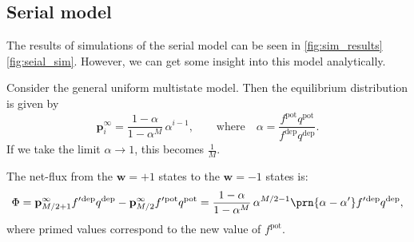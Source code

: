 \documentclass[10pt]{article}
\newcommand{\pr}{\mathbf{p}}
\newcommand{\eq}{\pr^\infty}
\newcommand{\w}{\mathbf{w}}
\newcommand{\pot}{^{\text{pot}}}
\newcommand{\dep}{^{\text{dep}}}
\begin{document}
%
%
%




\subsection{Serial model}\label{sec:multistate}

%
%


The results of simulations of the serial model can be seen in
\autoref{fig:sim_results}\ref{fig:seial_sim}.
However, we can get some insight into this model analytically.



Consider the general uniform multistate model.
Then the equilibrium distribution is given by
%
\begin{equation}\label{eq:mutltieq}
  \eq_i = \frac{1-\alpha}{1-\alpha^M}\,\alpha^{i-1},
  \qquad \text{where} \quad
  \alpha=\frac{f\pot q\pot}{f\dep q\dep}.
\end{equation}
%
If we take the limit $\alpha\rightarrow1$, this becomes $\frac{1}{M}$.

The net-flux from the $\w=+1$ states to the $\w=-1$ states is:
%
\begin{equation}\label{eq:multiflux}
  \Phi = \eq_{M/2+1}f'{}\dep q\dep - \eq_{M/2}f'{}\pot q\pot = \frac{1-\alpha}{1-\alpha^M}\,\alpha^{M/2-1}\prn{\alpha-\alpha'}f'{}\dep q\dep,
\end{equation}
%
where primed values correspond to the new value of $f\pot$.
\end{document}
